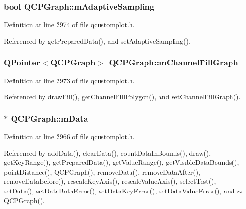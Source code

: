 \subsubsection[{m\+Adaptive\+Sampling}]{\setlength{\rightskip}{0pt plus 5cm}bool Q\+C\+P\+Graph\+::m\+Adaptive\+Sampling\hspace{0.3cm}{\ttfamily [protected]}}\label{class_q_c_p_graph_aa951e78aeba714cf443be6da2e52502e}


Definition at line 2974 of file qcustomplot.\+h.



Referenced by get\+Prepared\+Data(), and set\+Adaptive\+Sampling().

\hypertarget{class_q_c_p_graph_a2f1777c7accf8244fc640c33f0b04577}{}
\subsubsection[{m\+Channel\+Fill\+Graph}]{\setlength{\rightskip}{0pt plus 5cm}Q\+Pointer$<${\bf Q\+C\+P\+Graph}$>$ Q\+C\+P\+Graph\+::m\+Channel\+Fill\+Graph\hspace{0.3cm}{\ttfamily [protected]}}\label{class_q_c_p_graph_a2f1777c7accf8244fc640c33f0b04577}


Definition at line 2973 of file qcustomplot.\+h.



Referenced by draw\+Fill(), get\+Channel\+Fill\+Polygon(), and set\+Channel\+Fill\+Graph().

\hypertarget{class_q_c_p_graph_a8457c840f69a0ac49f61d30a509c5d08}{}
\subsubsection[{m\+Data}]{$\ast$ Q\+C\+P\+Graph\+::m\+Data\hspace{0.3cm}{\ttfamily [protected]}}\label{class_q_c_p_graph_a8457c840f69a0ac49f61d30a509c5d08}


Definition at line 2966 of file qcustomplot.\+h.



Referenced by add\+Data(), clear\+Data(), count\+Data\+In\+Bounds(), draw(), get\+Key\+Range(), get\+Prepared\+Data(), get\+Value\+Range(), get\+Visible\+Data\+Bounds(), point\+Distance(), Q\+C\+P\+Graph(), remove\+Data(), remove\+Data\+After(), remove\+Data\+Before(), rescale\+Key\+Axis(), rescale\+Value\+Axis(), select\+Test(), set\+Data(), set\+Data\+Both\+Error(), set\+Data\+Key\+Error(), set\+Data\+Value\+Error(), and $\sim$\+Q\+C\+P\+Graph().

